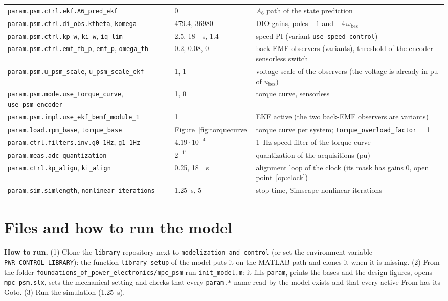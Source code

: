 \documentclass[11pt,a4paper]{scrartcl}
\newcommand{\ped}[1]{_{\mathrm{#1}}}
\newcommand{\code}[1]{\texttt{#1}}
\begin{document}
\begin{onehalfspace}
\begin{table}[H]
\begin{tabularx}{\textwidth}{@{} >{\raggedright\arraybackslash}p{5.3cm} l X @{}}
		\code{param.psm.ctrl.ekf.A6\_pred\_ekf} & 0 & $A_6$ path of the state prediction \\
		\code{param.psm.ctrl.di\_obs.ktheta}, \code{komega} & 479.4, 36980 & DIO gains, poles $-1$ and $-4\,\omega\ped{bez}$ \\
		\code{param.psm.ctrl.kp\_w}, \code{ki\_w}, \code{iq\_lim} & 2.5, \SI{18}{\per\second}, 1.4 & speed PI (variant \code{use\_speed\_control}) \\
		\code{param.psm.ctrl.emf\_fb\_p}, \code{emf\_p}, \code{omega\_th} & 0.2, 0.08, 0 & back-EMF observers (variants), threshold of the encoder--sensorless switch \\
		\code{param.psm.u\_psm\_scale}, \code{u\_psm\_scale\_ekf} & 1, 1 & voltage scale of the observers (the voltage is already in pu of $u\ped{bez}$) \\
		\code{param.psm.mode.use\_torque\_curve}, \code{use\_psm\_encoder} & 1, 0 & torque curve, sensorless \\
		\code{param.psm.impl.}\newline\code{use\_ekf\_bemf\_module\_1} & 1 & EKF active (the two back-EMF observers are variants) \\
		\code{param.load.rpm\_base}, \code{torque\_base} & Figure~\ref{fig:torquecurve} & torque curve per system; \code{torque\_overload\_factor} = 1 \\
		\code{param.ctrl.filters.inv.g0\_1Hz}, \code{g1\_1Hz} & $4.19\cdot10^{-4}$ & \SI{1}{\hertz} speed filter of the torque curve \\
		\code{param.meas.adc\_quantization} & $2^{-11}$ & quantization of the acquisitions (pu) \\
		\code{param.ctrl.kp\_align}, \code{ki\_align} & 0.25, \SI{18}{\per\second} & alignment loop of the clock (its mask has gains 0, open point~\ref{op:clock}) \\
		\code{param.sim.simlength}, \code{nonlinear\_iterations} & \SI{1.25}{\second}, 5 & stop time, Simscape nonlinear iterations \\
		\bottomrule
	\end{tabularx}
\end{table}

\section{Files and how to run the model}
\label{sec:files}

\textbf{How to run.} (1) Clone the \code{library} repository next to \code{modelization-and-control} (or set the environment variable \code{PWR\_CONTROL\_LIBRARY}): the function \code{library\_setup} of the model puts it on the MATLAB path and clones it when it is missing. (2) From the folder \code{foundations\_of\_power\_electronics/mpc\_psm} run \code{init\_model.m}: it fills \code{param}, prints the bases and the design figures, opens \code{mpc\_psm.slx}, sets the mechanical setting and checks that every \code{param.*} name read by the model exists and that every active From has its Goto. (3) Run the simulation (\SI{1.25}{\second}).


\end{onehalfspace}
\end{document}
